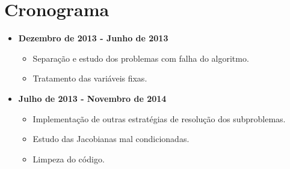 \documentclass[letterpaper,12pt]{article}
\numberwithin{equation}{section}
\begin{document}
\section{Cronograma}

\begin{itemize}
 \item {\bf  Dezembro de 2013 - Junho de 2013}
   \begin{itemize}
     \item Separação e estudo dos problemas com falha do algoritmo.
     \item Tratamento das variáveis fixas. 
   \end{itemize}
 \item {\bf  Julho de 2013 - Novembro de 2014}
   \begin{itemize}
     \item Implementação de outras estratégias de resolução dos subproblemas.
     \item Estudo das Jacobianas mal condicionadas.
     \item Limpeza do código.
   \end{itemize}
\end{itemize}



\end{document}
